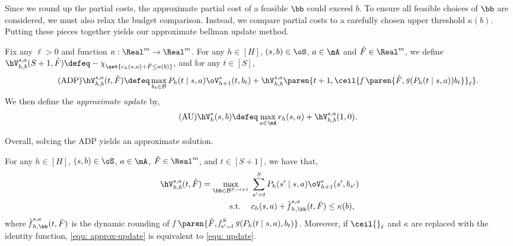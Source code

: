 \documentclass[pdftex, a4paper, 12pt]{article}
\newcommand{\jeremy}[1]{\textcolor{red}{#1}}
\newcommand{\round}[2]{\ceil{#2}_{#1}}
\newcommand{\mB}{\mathcal{B}}
\newcommand{\cmin}{c_{min}}
\newcommand{\cmax}{c_{max}}
\newcommand{\hF}{\hat{F}}
\DeclareMathOperator*{\f}{\mathit{f}}
\DeclareMathOperator*{\g}{\mathit{g}}
\begin{document}
Since we round up the partial costs, the approximate partial cost of a feasible $\bb$ could exceed $b$. To ensure all feasible choices of $\bb$ are considered, we must also relax the budget comparison. Instead, we compare partial costs to a carefully chosen upper threshold $\kappa(b)$. Putting these pieces together yields our approximate bellman update method.

\begin{definition}\label{def: approx-update}
    Fix any $\ell > 0$ and function $\kappa : \Real^m \to \Real^m$. For any $h \in [H]$, $(s,b) \in \oS$, $a \in \mA$ and $\hF \in \Real^m$, we define $\hV_{h,b}^{s,a}(S+1,\hF) \defeq -\chi_{\set{c_h(s,a) + \hF \leq \kappa(b)}}$, and for any $t \in [S]$,
    \begin{equation}\label{equ: approx-dp}\tag{ADP}
    \hV_{h,b}^{s,a}(t,\hF) \defeq \max_{b_t \in \mB} P_h(t \mid s,a)\oV^*_{h+1}(t,b_t) + \hV_{h,b}^{s,a}\paren{t+1, \round{\ell}{\f\paren{\hF, \g(P_h(t \mid s,a))b_t}}}.
    \end{equation}
    We then define the \emph{approximate update} by,
    \begin{equation}\label{equ: approx-update}\tag{AU}
    \hV_{h}^*(s,b) \defeq \max_{a \in \mA} r_h(s,a) + \hV_{h,b}^{s,a}(1, 0).
    \end{equation}
\end{definition}

Overall, solving the ADP yields an approximate solution. 

\begin{lemma}[Approximation]\label{lem: approx-update}
    For any $h \in [H]$, $(s,b) \in \oS$, $a \in \mA$, $\hF \in \Real^m$, and $t \in [S+1]$, we have that,
    \begin{equation}\label{equ: approx-opt}
        \begin{split}
            \hV^{s,a}_{h,b}(t,\hF) = \max_{\bb \in \mB^{S-t+1}} & \; \sum_{s' = t}^S P_h(s' \mid s,a) \oV^*_{h+1}(s',b_{s'}) \\
            \text{s.t.} \quad  & \; c_h(s,a) + \hat{\f}_{h, \bb}^{s,a}(t, \hF) \leq \kappa(b),
        \end{split}
    \end{equation}
    where $\hat{\f}_{h,\bb}^{s,a}(t, \hF)$ is the dynamic rounding of $\f\paren{\hF, \f_{s' = t}^S \g(P_h(t \mid s,a), b_t)}$. 
    Moreover, if $\round{\ell}{}$ and $\kappa$ are replaced with the identity function, \eqref{equ: approx-update} is equivalent to \eqref{equ: update}.
\end{lemma}
\end{document}

